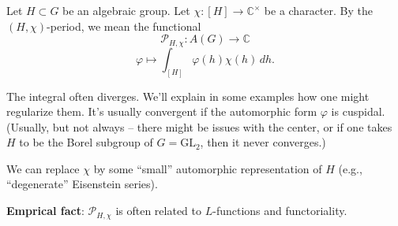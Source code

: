 \documentclass[reqno]{amsart} 
\numberwithin{theorem}{section}
\numberwithin{equation}{section}
\numberwithin{exercise}{section}
\begin{document}
Let $H \subset G$ be an algebraic group.  Let $\chi :[H] \rightarrow \mathbb{C}^\times$ be a character.  By the $(H, \chi)$-period, we mean the functional
\begin{equation*}
  \mathcal{P}_{H, \chi} : A(G) \rightarrow \mathbb{C}
\end{equation*}
\begin{equation*}
  \varphi \mapsto \int_{[H]} \varphi(h) \chi(h) \, d h.
\end{equation*}
\begin{remark}\label{remark:cq6tho091q}
  The integral often diverges.  We'll explain in some examples how one might regularize them.  It's usually convergent if the automorphic form $\varphi$ is cuspidal.  (Usually, but not always -- there might be issues with the center, or if one takes $H$ to be the Borel subgroup of $G = \mathrm{GL}_2$, then it never converges.)
\end{remark}

\begin{remark}\label{remark:cq6tho3lbh}
  We can replace $\chi$ by some ``small'' automorphic representation of $H$ (e.g., ``degenerate'' Eisenstein series).
\end{remark}

\textbf{Emprical fact}: $\mathcal{P}_{H, \chi}$ is often related to $L$-functions and functoriality.
\end{document}
